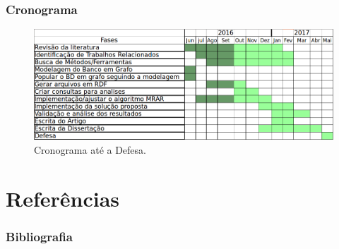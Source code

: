 \documentclass[hyperref={pdfpagelabels=false}]{beamer}
\begin{document}
    
\begin{frame}
\frametitle{Cronograma}
\begin{figure}[C] 
	\centering
		\includegraphics[scale=0.3]{img/Cronograma.png}
	\caption{Cronograma até a Defesa.}
    
	\label{fig:Cronograma}
\end{figure}
\end{frame}



\section {Referências}
\begin{frame}
\frametitle{Bibliografia}
    
    \small{  }
\end{frame}
\end{document}
